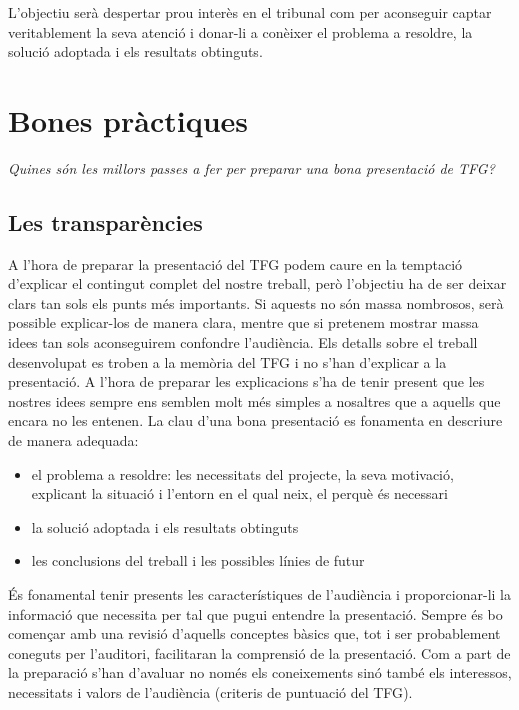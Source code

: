 L'objectiu serà despertar prou interès en el tribunal com per aconseguir captar veritablement la seva atenció i donar-li a conèixer el problema a resoldre, la solució adoptada i els resultats obtinguts.

\section{Bones pràctiques}
\emph{Quines són les millors passes a fer per preparar una bona presentació de \ac{TFG}?}

\subsection{Les transparències}

        A l'hora de preparar la presentació del \ac{TFG} podem caure en la temptació d'explicar el contingut complet del nostre treball, però l'objectiu ha de ser deixar clars tan sols els punts més importants. Si aquests no són massa nombrosos, serà possible explicar-los de manera clara, mentre que si pretenem mostrar massa idees tan sols aconseguirem confondre l'audiència. Els detalls sobre el treball desenvolupat es troben a la memòria del \ac{TFG} i no s'han d'explicar a la presentació. A l'hora de preparar les explicacions s'ha de tenir present que les nostres idees sempre ens semblen molt més simples a nosaltres que a aquells que encara no les entenen. La clau d'una bona presentació es fonamenta en descriure de manera adequada:
        \begin{itemize}\tightlist
            \item el problema a resoldre: les necessitats del projecte, la seva motivació, explicant la situació i l'entorn en el qual neix, el perquè és necessari
            \item la solució adoptada i els resultats obtinguts
            \item les conclusions del treball i les possibles línies de futur
        \end{itemize}

        És fonamental tenir presents les característiques de l'audiència i proporcionar-li la informació que necessita per tal que pugui entendre la presentació. Sempre és bo començar amb una revisió d'aquells conceptes bàsics que, tot i ser probablement coneguts per l'auditori, facilitaran la comprensió de la presentació. Com a part de la preparació s'han d'avaluar no només els coneixements sinó també els interessos, necessitats i valors de l'audiència (criteris de puntuació del \ac{TFG}).

